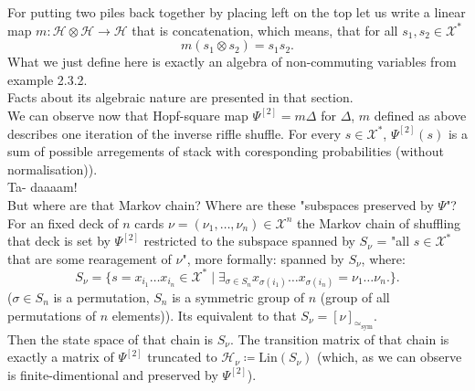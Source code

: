 \documentclass[a4paper, 12pt]{report}
\newcommand{\SimeqSym}{{\simeq_\mathrm{sym}}}
\begin{document}
For putting two piles back together by placing left on the top let us write a linear map 
$m : \mathcal{H} \otimes \mathcal{H} \to \mathcal{H}$ that is concatenation, which means, that 
for all $s_1, s_2 \in \mathcal{X}^*$
\begin{equation*}
m(s_1 \otimes s_2) = s_1s_2.
\end{equation*}
What we just define here is exactly an algebra of non-commuting variables from example 
2.3.2.\\
Facts about its algebraic nature are presented in that section. \\
We can observe now that Hopf-square map $\Psi^{[2]} = m\Delta$ for $\Delta$, $m$ defined as above 
describes one iteration of the inverse riffle shuffle. For every $s \in \mathcal{X}^*$, $\Psi^{[2]}(s)$ is 
a sum of possible arregements of stack with coresponding probabilities (without normalisation)). 
\\ Ta- daaaam! \\[4pt]
But where are that Markov chain? Where are these "subspaces preserved by $\Psi$"? \\
For an fixed deck of $n$ cards $\nu = (\nu_1, \dots, \nu_n) \in \mathcal{X}^n$ the Markov chain of shuffling 
that deck is set by $\Psi^{[2]}$ restricted to the subspace spanned by $S_\nu$ = "all $s \in \mathcal{X}^*$ 
that are some rearagement of $\nu$", more formally: spanned by $S_\nu$, where:
\begin{equation*}
S_\nu = \{ s = x_{i_1}\dots x_{i_n} \in \mathcal{X}^* \mid
\exists_{\sigma \in S_n} x_{\sigma(i_1)}\dots x_{\sigma(i_n)} = \nu_1\dots \nu_n. \}.
\end{equation*}
($\sigma \in S_n$ is a permutation, $S_n$ is a symmetric group of $n$ (group of 
all permutations of $n$ elements)). Its equivalent to that $S_\nu = [\nu]_\SimeqSym$.\\
Then the state space of that chain is $S_\nu$. The transition matrix of that chain is exactly a matrix of 
$\Psi^{[2]}$ truncated to $\mathcal{H}_\nu \coloneqq \mathrm{Lin}(S_\nu)$ 
(which, as we can observe is finite-dimentional and preserved by $\Psi^{[2]}$). \\[8pt]
\end{document}
